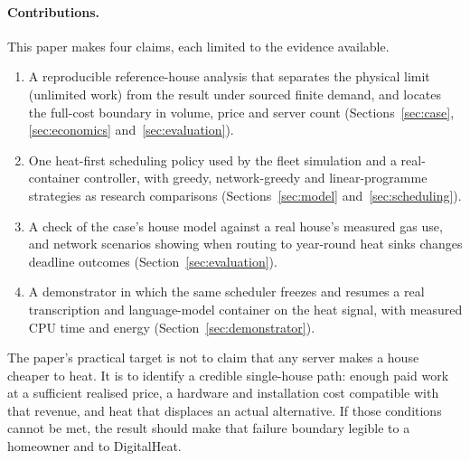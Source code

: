 \paragraph{Contributions.} This paper makes four claims, each limited to the evidence available.
\begin{enumerate}
  \item A reproducible reference-house analysis that separates the physical limit (unlimited work)
    from the result under sourced finite demand, and locates the full-cost boundary in volume,
    price and server count (Sections~\ref{sec:case}, \ref{sec:economics} and~\ref{sec:evaluation}).
  \item One heat-first scheduling policy used by the fleet simulation and a real-container controller,
    with greedy, network-greedy and linear-programme strategies as research comparisons
    (Sections~\ref{sec:model} and~\ref{sec:scheduling}).
  \item A check of the case's house model against a real house's measured gas use, and network
    scenarios showing when routing to year-round heat sinks changes deadline outcomes
    (Section~\ref{sec:evaluation}).
  \item A demonstrator in which the same scheduler freezes and resumes a real transcription and
    language-model container on the heat signal, with measured CPU time and energy
    (Section~\ref{sec:demonstrator}).
\end{enumerate}

The paper's practical target is not to claim that any server makes a house cheaper to heat. It is
to identify a credible single-house path: enough paid work at a sufficient realised price, a
hardware and installation cost compatible with that revenue, and heat that displaces an actual
alternative. If those conditions cannot be met, the result should make that failure boundary
legible to a homeowner and to DigitalHeat.
